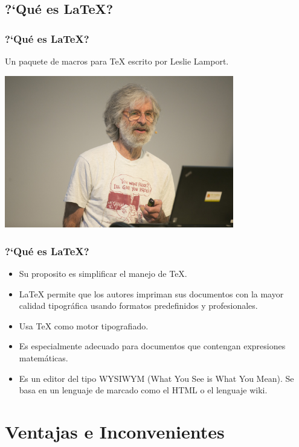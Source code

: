 \documentclass[aspectratio=43]{beamer}%
\begin{document}
\subsection{?`Qué es \LaTeX{}?}
\begin{frame}[fragile]
\frametitle{\textbf{?`Qué es \LaTeX{}?}}
\justifying
Un paquete de macros para \TeX{} escrito por Leslie Lamport.
\begin{center}
\includegraphics[width=10cm]{images/Lamport-Kreutzer}
\end{center}

\end{frame}

\begin{frame}[fragile]
\frametitle{\textbf{?`Qué es \LaTeX{}?}}
\justifying
 \begin{itemize}\justifying
  \item Su proposito es simplificar el manejo de \TeX{}.
  \item \LaTeX{} permite que los autores impriman sus documentos con la mayor calidad tipográfica usando formatos predefinidos y profesionales.
  \item Usa \TeX{} como motor tipografiado.
  \item Es especialmente adecuado para documentos que contengan expresiones matemáticas.
  \item Es un editor del tipo WYSIWYM (What You See is What You Mean). Se basa en un lenguaje de marcado como el HTML o el lenguaje wiki.
\end{itemize}

\end{frame}

\section{Ventajas e Inconvenientes}
\end{document}
